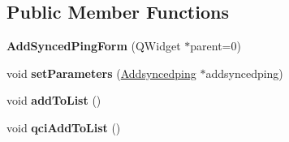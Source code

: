 \subsection*{Public Member Functions}
\begin{DoxyCompactItemize}
\item 
{\bfseries Add\+Synced\+Ping\+Form} (Q\+Widget $\ast$parent=0)\hypertarget{class_add_synced_ping_form_a36047370b1fc7b046347336813fa77a1}{}\label{class_add_synced_ping_form_a36047370b1fc7b046347336813fa77a1}

\item 
void {\bfseries set\+Parameters} (\hyperlink{class_addsyncedping}{Addsyncedping} $\ast$addsyncedping)\hypertarget{class_add_synced_ping_form_a7b200bbaa3aa72010ae2cd728ca97614}{}\label{class_add_synced_ping_form_a7b200bbaa3aa72010ae2cd728ca97614}

\item 
void {\bfseries add\+To\+List} ()\hypertarget{class_add_synced_ping_form_ab40ee058786404ed1110a1fbbf63aeac}{}\label{class_add_synced_ping_form_ab40ee058786404ed1110a1fbbf63aeac}

\item 
void {\bfseries qci\+Add\+To\+List} ()\hypertarget{class_add_synced_ping_form_a21fa236de271d7f3cf6e77829d8614a6}{}\label{class_add_synced_ping_form_a21fa236de271d7f3cf6e77829d8614a6}

\end{DoxyCompactItemize}
